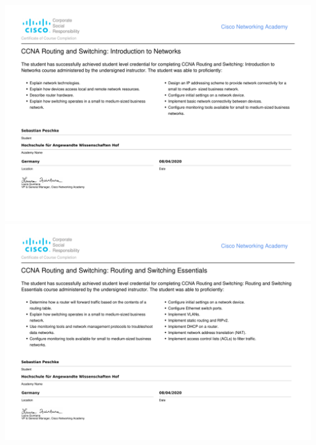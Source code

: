 \documentclass[
	10pt, %
]{FreemanCV}
\begin{document}
\begin{landscape}
	\includegraphics[scale=0.8]{./assets/SebastianPeschke-HOF_2020_I2N_HEY-certificate}
	\newpage
	\includegraphics[scale=0.8]{./assets/SebastianPeschke-HOF_2020_RSE_HEY-certificate}
\end{landscape}
\end{document}
